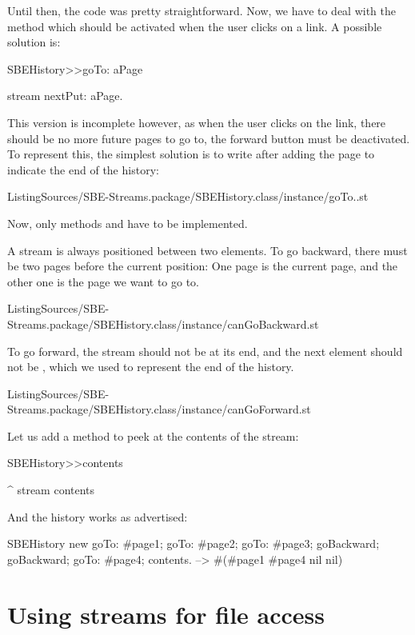 \documentclass[a4paper,10pt,twoside]{book}
\begin{document}
Until then, the code was pretty straightforward.
Now, we have to deal with the  method which should be activated when the user clicks on a link.
A possible solution is:

\begin{code}{}
SBEHistory>>goTo: aPage

	stream nextPut: aPage.
\end{code}

This version is incomplete however, as when the user clicks on the link, there should be no more future pages to go to, \ie the forward button must be deactivated.
To represent this, the simplest solution is to write  after adding the page to indicate the end of the history:

\numFiletreeMethodInput[sbehistorygoto]%
{}%
{ListingSources/SBE-Streams.package/SBEHistory.class/instance/goTo..st}

Now, only methods  and  have to be implemented.

A stream is always positioned between two elements.
To go backward, there must be two pages before the current position:
One page is the current page, and the other one is the page we want to go to.

\numFiletreeMethodInput[sbehistorycangobackward]%
{}%
{ListingSources/SBE-Streams.package/SBEHistory.class/instance/canGoBackward.st}

To go forward, the stream should not be at its end, and the next element should not be , which we used to represent the end of the history.

\numFiletreeMethodInput[sbehistorycangoforward]%
{}%
{ListingSources/SBE-Streams.package/SBEHistory.class/instance/canGoForward.st}

Let us add a method to peek at the contents of the stream:
\begin{code}{}
SBEHistory>>contents

	^ stream contents
\end{code}

And the history works as advertised:
\begin{code}{}
SBEHistory new
	goTo: #page1;
	goTo: #page2;
	goTo: #page3;
	goBackward;
	goBackward;
	goTo: #page4;
	contents. --> #(#page1 #page4 nil nil)
\end{code}

\section{Using streams for file access}
\end{document}
